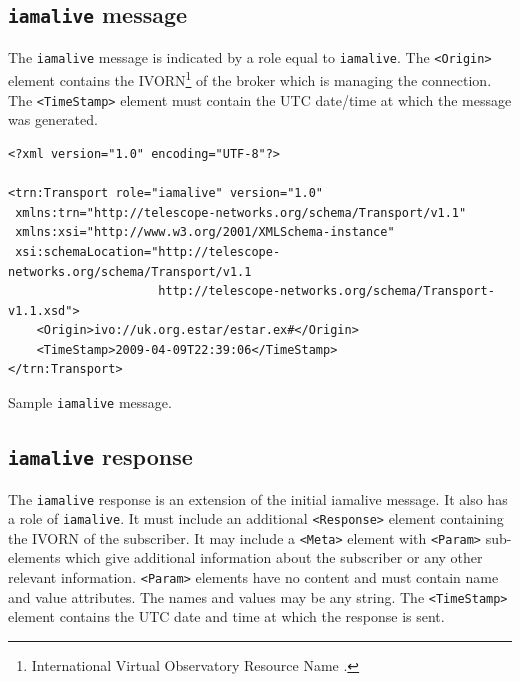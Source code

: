 \documentclass[a4paper,11pt]{ivoa}
\begin{document}
\subsection{\texttt{iamalive} message}
\label{sec:transport:iamalive}

The \texttt{iamalive} message is indicated by a role equal to
\texttt{iamalive}. The \texttt{<Origin>} element contains the
IVORN\footnote{International Virtual Observatory Resource Name
\citep{Plante:2007}.} of the broker which is managing the connection.  The
\texttt{<TimeStamp>} element must contain the UTC date/time at which the
message was generated.

\begin{listing*}
\begin{verbatim}
<?xml version="1.0" encoding="UTF-8"?>

<trn:Transport role="iamalive" version="1.0"
 xmlns:trn="http://telescope-networks.org/schema/Transport/v1.1"
 xmlns:xsi="http://www.w3.org/2001/XMLSchema-instance"
 xsi:schemaLocation="http://telescope-networks.org/schema/Transport/v1.1
                     http://telescope-networks.org/schema/Transport-v1.1.xsd">
    <Origin>ivo://uk.org.estar/estar.ex#</Origin>
    <TimeStamp>2009-04-09T22:39:06</TimeStamp>
</trn:Transport>
\end{verbatim}
\caption{Sample \texttt{iamalive} message.}
\label{lst:iamalive}
\end{listing*}

\subsection{\texttt{iamalive} response}
\label{sec:transport:iamaliveresponse}

The \texttt{iamalive} response is an extension of the initial iamalive
message. It also has a role of \texttt{iamalive}. It must include an
additional \texttt{<Response>} element containing the IVORN of the subscriber.
It may include a \texttt{<Meta>} element with \texttt{<Param>} sub-elements
which give additional information about the subscriber or any other relevant
information. \texttt{<Param>} elements have no content and must contain name
and value attributes. The names and values may be any string. The
\texttt{<TimeStamp>} element contains the UTC date and time at which the
response is sent.
\end{document}
